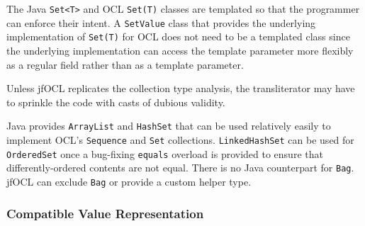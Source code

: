 \documentclass[sigconf]{acmart}
\begin{document}


The Java \verb|Set<T>| and OCL \verb|Set(T)| classes are templated so that the programmer can enforce their intent. A \verb|SetValue| class that provides the underlying implementation of \verb|Set(T)| for OCL does not need to be a templated class since the underlying implementation can access the template parameter more flexibly as a regular field rather than as a template parameter. 

Unless jfOCL replicates the collection type analysis, the transliterator may have to sprinkle the code with casts of dubious validity.

Java provides \verb|ArrayList| and \verb|HashSet| that can be used relatively easily to implement OCL's \verb|Sequence| and \verb|Set| collections. \verb|LinkedHashSet| can be used for \verb|OrderedSet| once a bug-fixing \verb|equals| overload is provided to ensure that differently-ordered contents are not equal. There is no Java counterpart for \verb|Bag|. jfOCL can exclude \verb|Bag| or provide a custom helper type.

\subsubsection{Compatible Value Representation}
\end{document}
